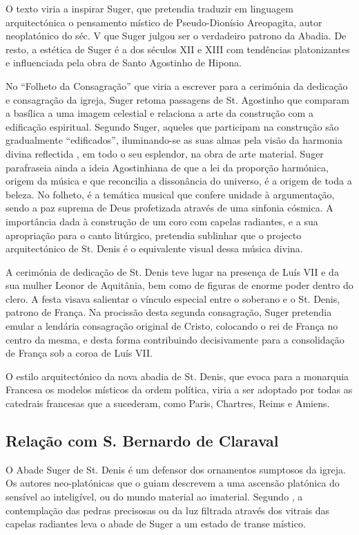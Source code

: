 \documentclass{article}
\begin{document}
O texto viria a inspirar Suger, que pretendia traduzir em linguagem
arquitectónica o pensamento místico de Pseudo-Dionísio Areopagita,
autor neoplatónico do séc. V que Suger julgou ser o verdadeiro patrono
da Abadia. De resto, a estética de Suger é a dos séculos XII e XIII
com tendências platonizantes e influenciada pela obra de Santo
Agostinho de Hipona.

No ``Folheto da Consagração'' que viria a escrever para a cerimónia da
dedicação e consagração da igreja, Suger retoma passagens de
St. Agostinho que comparam a basílica a uma imagem celestial e
relaciona a arte da construção com a edificação espiritual. Segundo
Suger, aqueles que participam na construção são gradualmente
``edificados'', iluminando-se as suas almas pela visão da harmonia
divina reflectida , em todo o seu esplendor, na obra de arte
material. Suger parafraseia ainda a ideia Agostinhiana de que a lei da
proporção harmónica, origem da música e que reconcilia a dissonância
do universo, é a origem de toda a beleza. No folheto, é a temática
musical que confere unidade à argumentação, sendo a paz suprema de
Deus profetizada através de uma sinfonia cósmica. A importância dada à
construção de um coro com capelas radiantes, e a sua apropriação para
o canto litúrgico, pretendia sublinhar que o projecto arquitectónico
de St. Denis é o equivalente visual dessa música divina.

A cerimónia de dedicação de St. Denis teve lugar na presença de Luís
VII e da sua mulher Leonor de Aquitânia, bem como de figuras de enorme
poder dentro do clero. A festa visava salientar o vínculo especial
entre o soberano e o St. Denis, patrono de França. Na procissão desta
segunda consagração, Suger pretendia emular a lendária consagração
original de Cristo, colocando o rei de França no centro da mesma, e
desta forma contribuindo decisivamente para a consolidação de França
sob a coroa de Luís VII.

O estilo arquitectónico da nova abadia de St. Denis, que evoca para a
monarquia Francesa os modelos místicos da ordem política, viria a ser
adoptado por todas as catedrais francesas que a sucederam, como Paris,
Chartres, Reims e Amiens.

\subsection{Relação com S. Bernardo de Claraval}

O Abade Suger de St. Denis é um defensor dos ornamentos sumptosos da
igreja. Os autores neo-platónicas que o guiam descrevem a uma ascensão
platónica do sensível ao inteligível, ou do mundo material ao
imaterial. Segundo \cite{panosvsky}, a contemplação das pedras
precisosas ou da luz filtrada através dos vitrais das capelas
radiantes leva o abade de Suger a um estado de transe místico.
\end{document}
